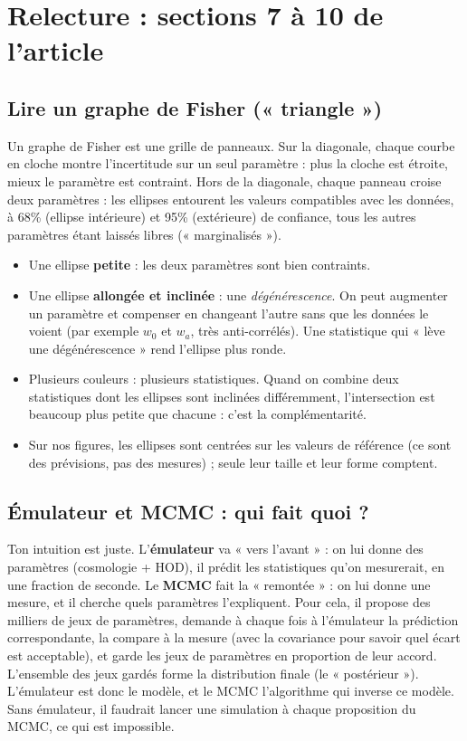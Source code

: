 \section{Relecture : sections 7 à 10 de l'article}

\subsection{Lire un graphe de Fisher (« triangle »)}
Un graphe de Fisher est une grille de panneaux. Sur la diagonale, chaque courbe en cloche montre l'incertitude sur un seul paramètre : plus la cloche est étroite, mieux le paramètre est contraint. Hors de la diagonale, chaque panneau croise deux paramètres : les ellipses entourent les valeurs compatibles avec les données, à 68\% (ellipse intérieure) et 95\% (extérieure) de confiance, tous les autres paramètres étant laissés libres (« marginalisés »).
\begin{itemize}
\item Une ellipse \textbf{petite} : les deux paramètres sont bien contraints.
\item Une ellipse \textbf{allongée et inclinée} : une \emph{dégénérescence}. On peut augmenter un paramètre et compenser en changeant l'autre sans que les données le voient (par exemple $w_0$ et $w_a$, très anti-corrélés). Une statistique qui « lève une dégénérescence » rend l'ellipse plus ronde.
\item Plusieurs couleurs : plusieurs statistiques. Quand on combine deux statistiques dont les ellipses sont inclinées différemment, l'intersection est beaucoup plus petite que chacune : c'est la complémentarité.
\item Sur nos figures, les ellipses sont centrées sur les valeurs de référence (ce sont des prévisions, pas des mesures) ; seule leur taille et leur forme comptent.
\end{itemize}

\subsection{Émulateur et MCMC : qui fait quoi ?}
Ton intuition est juste. L'\textbf{émulateur} va « vers l'avant » : on lui donne des paramètres (cosmologie + HOD), il prédit les statistiques qu'on mesurerait, en une fraction de seconde. Le \textbf{MCMC} fait la « remontée » : on lui donne une mesure, et il cherche quels paramètres l'expliquent. Pour cela, il propose des milliers de jeux de paramètres, demande à chaque fois à l'émulateur la prédiction correspondante, la compare à la mesure (avec la covariance pour savoir quel écart est acceptable), et garde les jeux de paramètres en proportion de leur accord. L'ensemble des jeux gardés forme la distribution finale (le « postérieur »). L'émulateur est donc le modèle, et le MCMC l'algorithme qui inverse ce modèle. Sans émulateur, il faudrait lancer une simulation à chaque proposition du MCMC, ce qui est impossible.


